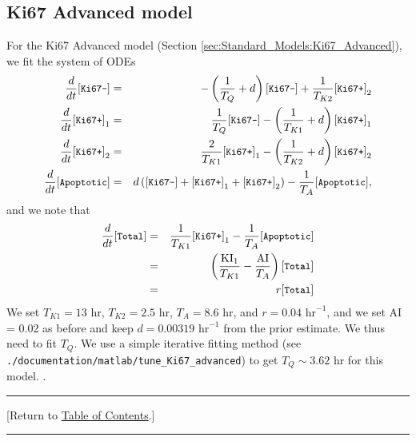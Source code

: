 \documentclass[12pt]{article}
\newcommand{\beqa}{\begin{eqnarray}}
\newcommand{\eeqa}{\end{eqnarray}}
\renewcommand{\v}{\verb}
\renewcommand{\tt}[1]{{\small \left[\texttt{#1}\right] }}
\newcommand{\TOClink}{\begin{center}\hrule\vskip-10pt\phantom{.}\hfill[Return to \hyperlink{TOC}{Table of Contents}.]\hfill\phantom{.}\vskip3pt\hrule\end{center}}
\begin{document}
\subsection{Ki67 Advanced model}
\label{sec:parameters:Ki67_advanced}
For the Ki67 Advanced model (Section \ref{sec:Standard_Models:Ki67_Advanced}), 
we fit the system of ODEs 
\beqa
\frac{d}{dt}\tt{Ki67-} & = & -\left( \frac{1}{T_Q} + d \right) \tt{Ki67-} + \frac{1}{T_{K2}}\tt{Ki67+}_2  \\
\frac{d}{dt}\tt{Ki67+}_1 & = & \frac{1}{T_Q} \tt{Ki67-} - \left( \frac{1}{T_{K1}} + d \right) \tt{Ki67+}_1 \\
\frac{d}{dt}\tt{Ki67+}_2 & = &  \frac{2}{T_{K1}} \tt{Ki67+}_1 - \left( \frac{1}{T_{K2}} + d \right) \tt{Ki67+}_2 \\
\frac{d}{dt}\tt{Apoptotic} & = & d\left( \tt{Ki67-} + \tt{Ki67+}_1 + \tt{Ki67+}_2 \right) -\frac{1}{T_A} \tt{Apoptotic}, 
\eeqa
and we note that 
\beqa
\frac{d}{dt}\tt{Total} 
& = & \frac{1}{T_{K1}} \tt{Ki67+}_1 - \frac{1}{T_A} \tt{Apoptotic} \nonumber \\ 
& = & \left( \frac{\textrm{KI}_1}{T_{K1}} - \frac{\textrm{AI}}{T_A} \right) \tt{Total} \nonumber \\ 
& = & r \tt{Total} 
\eeqa
We set $T_{K1} = 13$ hr, $T_{K2} = 2.5$ hr, $T_A = 8.6$ hr, and 
$r = 0.04 \textrm{ hr}^{-1}$, and we set AI = 0.02 as before and keep 
$d = 0.00319 \textrm{ hr}^{-1}$ from the prior estimate. We thus need to fit  
$T_Q$. We use a simple iterative fitting method 
(see \v|./documentation/matlab/tune_Ki67_advanced|) to get $T_Q \sim 3.62 \textrm{ hr}$ for this model. 
\cite{ref:Ki67_MCF10A}. 

\TOClink 
\end{document}
